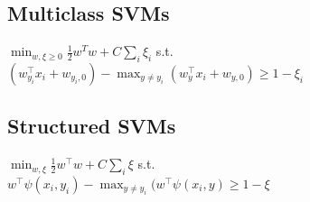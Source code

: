 \subsection*{Multiclass SVMs}
$\min_{w, \xi\geq 0} \frac{1}{2} w^T w + C \sum_i \xi_i$ s.t. \\
$(w_{y_i}^\top x_i + w_{y_i, 0}) - \max_{y \neq y_i} (w_y^\top x_i + w_{y,0}) \geq 1 - \xi_i$

\subsection*{Structured SVMs}
$\min_{w, \xi} \frac{1}{2} w^\top w + C \sum_i \xi$ s.t. \\
$w^\top \psi(x_i, y_i) - \max_{y \neq y_i} (w^\top \psi(x_i, y) \geq 1 - \xi$










